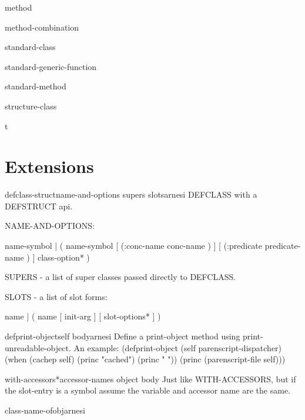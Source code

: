 \begin{class}{method}{}{}{}
  
\end{class}

\begin{class}{method-combination}{}{}{}
  
\end{class}

\begin{class}{standard-class}{}{}{}
  
\end{class}

\begin{class}{standard-generic-function}{}{}{}
  
\end{class}

\begin{class}{standard-method}{}{}{}
  
\end{class}

\begin{class}{structure-class}{}{}{}
  
\end{class}

\begin{class}{t}{}{}{}
  
\end{class}

\section{Extensions}
\label{sec:extensions}

\begin{macro}{defclass-struct}{name-and-options supers \rest slots}{arnesi}{}
  DEFCLASS with a DEFSTRUCT api.

NAME-AND-OPTIONS:

  name-symbol |
  ( name-symbol [ (:conc-name conc-name ) ]
                [ (:predicate predicate-name ) ]
                class-option* )

SUPERS - a list of super classes passed directly to DEFCLASS.

SLOTS - a list of slot forms:

  name |
  ( name [ init-arg ] [ slot-options* ] )
\end{macro}

\begin{macro}{defprint-object}{self \body body}{arnesi}{}
  Define a print-object method using print-unreadable-object.
  An example:
  (defprint-object (self parenscript-dispatcher)
    (when (cachep self)
      (princ "cached")
      (princ " "))
    (princ (parenscript-file self)))
\end{macro}

\begin{macro}{with-accessors*}{accessor-names object \body body}{}{}
  Just like WITH-ACCESSORS, but if the slot-entry is a symbol assume
  the variable and accessor name are the same.
\end{macro}

\begin{function}{class-name-of}{obj}{arnesi}{}
  
\end{function}

